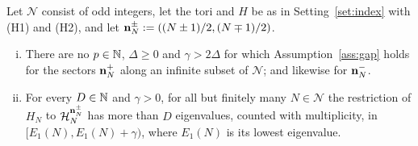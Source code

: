 \begin{corollary}\label{cor:classwide-odd}
Let $\mathcal N$ consist of odd integers, let the tori and $H$ be as in Setting~\ref{set:index} with (H1) and (H2),
and let $\mathbf{n}^\pm_N:=((N\pm1)/2,(N\mp1)/2)$.
\begin{enumerate}[(i)]
\item There are no $p\in\mathbb{N}$, $\Delta\ge0$ and $\gamma>2\Delta$ for which Assumption~\ref{ass:gap} holds for the sectors
$\mathbf{n}^+_N$ along an infinite subset of $\mathcal N$; and likewise for $\mathbf{n}^-_N$.
\item For every $D\in\mathbb{N}$ and $\gamma>0$, for all but finitely many $N\in\mathcal N$ the restriction of $H_N$ to
$\mathcal{H}_N^{\mathbf{n}^\pm_N}$ has more than $D$ eigenvalues, counted with multiplicity, in $[E_1(N),E_1(N)+\gamma)$, where
$E_1(N)$ is its lowest eigenvalue.
\end{enumerate}
\end{corollary}

